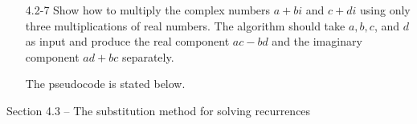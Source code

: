 \begin{enumerate}
\begin{framed}
\end{framed}

\item[4.2{-}7]{Show how to multiply the complex numbers $a + b i$ and $c + di$
using only three multiplications of real numbers. The algorithm should take
$a, b, c$, and $d$ as input and produce the real component $ac - bd$ and the
imaginary component $ad + bc$ separately.}

\begin{framed}
The pseudocode is stated below.\\
\begin{algorithm}[H]
\SetAlgoNoEnd\DontPrintSemicolon
\BlankLine
{}
\end{algorithm}
\end{framed}

\end{enumerate}

\newpage

{\large Section 4.3 {--} The substitution method for solving recurrences}

